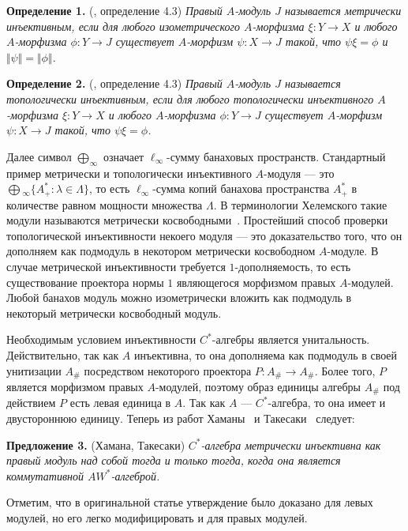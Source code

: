 \documentclass[12pt]{article}
\begin{document}
\medskip
\textbf{Определение 1.} (\cite{HelMetrFrQMod}, определение 4.3) \textit{Правый
$A$-модуль $J$ называется метрически инъективным, если для любого
изометрического $A$-морфизма $\xi:Y\to X$ и любого $A$-морфизма $\phi:Y\to J$
существует $A$-морфизм $\psi:X\to J$ такой, что $\psi\xi=\phi$  и
$\Vert\psi\Vert=\Vert\phi\Vert$.}

\medskip
\textbf{Определение 2.} (\cite{HelMetrFrQMod}, определение 4.3) \textit{Правый
$A$-модуль $J$ называется топологически инъективным, если для любого
топологически инъективного $A$-морфизма $\xi:Y\to X$ и любого $A$-морфизма
$\phi:Y\to J$ существует $A$-морфизм $\psi:X\to J$ такой, что $\psi\xi=\phi$.}

\medskip
Далее символ $\bigoplus_\infty$ означает $\ell_\infty$-сумму банаховых
пространств. Стандартный пример метрически и топологически инъективного
$A$-модуля --- это $\bigoplus{}_\infty \{A_+^*:\lambda\in\Lambda \}$, то есть
$\ell_\infty$-сумма копий банахова пространства $A_+^*$ в количестве равном
мощности множества $\Lambda$. В терминологии Хелемского такие модули называются
метрически косвободными~\cite{HelMetrFrQMod}. Простейший способ проверки
топологической инъективности некоего модуля --- это доказательство того, что он
дополняем как подмодуль в некотором метрически косвободном $A$-модуле. В случае
метрической инъективности требуется $1$-дополняемость, то есть существование
проектора нормы $1$ являющегося морфизмом правых $A$-модулей. Любой банахов
модуль можно изометрически вложить как подмодуль в некоторый метрически
косвободный модуль.

Необходимым условием инъективности $C^*$-алгебры является унитальность.
Действительно, так как $A$ инъективна, то она дополняема как подмодуль в своей
унитизации $A_\#$ посредством некоторого проектора $P:A_\#\to A_\#$. Более того,
$P$ является морфизмом правых $A$-модулей, поэтому образ единицы алгебры $A_\#$
под действием $P$ есть левая единица в $A$. Так как $A$ --- $C^*$-алгебра, то
она имеет и двустороннюю единицу. Теперь из работ Хаманы~\cite{HamInjEnvBanMod}
и Такесаки~\cite{TakHanBanThAndJordDecomOfModMap} следует:

\medskip
\textbf{Предложение 3.} (Хамана, Такесаки) \textit{$C^*$-алгебра метрически
инъективна как правый модуль над собой тогда и только тогда, когда она является
коммутативной $AW^*$-алгеброй.}

\medskip
Отметим, что в оригинальной статье утверждение было доказано для левых модулей,
но его легко модифицировать и для правых модулей.
\end{document}
